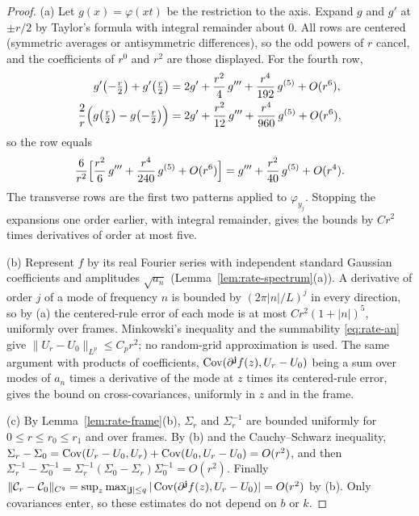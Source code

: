 \begin{proof}
(a) Let $g(x)=\varphi(xt)$ be the restriction to the axis. Expand $g$ and $g'$ at $\pm r/2$ by Taylor's formula with integral remainder about $0$. All rows are centered (symmetric averages or antisymmetric differences), so the odd powers of $r$ cancel, and the coefficients of $r^0$ and $r^2$ are those displayed. For the fourth row,
\begin{align*}
g'\bigl(-\tfrac r2\bigr)+g'\bigl(\tfrac r2\bigr)&=2g'+\frac{r^2}4\,g'''+\frac{r^4}{192}\,g^{(5)}+O(r^6),\\
\frac2r\Bigl(g\bigl(\tfrac r2\bigr)-g\bigl(-\tfrac r2\bigr)\Bigr)&=2g'+\frac{r^2}{12}\,g'''+\frac{r^4}{960}\,g^{(5)}+O(r^6),
\end{align*}
so the row equals
\[
\frac6{r^2}\Bigl[\frac{r^2}6\,g'''+\frac{r^4}{240}\,g^{(5)}+O(r^6)\Bigr]=g'''+\frac{r^2}{40}\,g^{(5)}+O(r^4).
\]
The transverse rows are the first two patterns applied to $\varphi_{y_j}$. Stopping the expansions one order earlier, with integral remainder, gives the bounds by $Cr^2$ times derivatives of order at most five.

(b) Represent $f$ by its real Fourier series with independent standard Gaussian coefficients and amplitudes $\sqrt{a_n}$ (Lemma~\ref{lem:rate-spectrum}(a)). A derivative of order $j$ of a mode of frequency $n$ is bounded by $(2\pi|n|/L)^j$ in every direction, so by (a) the centered-rule error of each mode is at most $Cr^2(1+|n|)^5$, uniformly over frames. Minkowski's inequality and the summability \eqref{eq:rate-an} give $\|U_r-U_0\|_{L^p}\le C_pr^2$; no random-grid approximation is used. The same argument with products of coefficients, $\operatorname{Cov}(\partial^{\mathbf j}f(z),U_r-U_0)$ being a sum over modes of $a_n$ times a derivative of the mode at $z$ times its centered-rule error, gives the bound on cross-covariances, uniformly in $z$ and in the frame.

(c) By Lemma~\ref{lem:rate-frame}(b), $\Sigma_r$ and $\Sigma_r^{-1}$ are bounded uniformly for $0\le r\le r_0\le r_1$ and over frames. By (b) and the Cauchy--Schwarz inequality, $\Sigma_r-\Sigma_0=\operatorname{Cov}(U_r-U_0,U_r)+\operatorname{Cov}(U_0,U_r-U_0)=O(r^2)$, and then $\Sigma_r^{-1}-\Sigma_0^{-1}=\Sigma_r^{-1}(\Sigma_0-\Sigma_r)\Sigma_0^{-1}=O(r^2)$. Finally $\|\mathcal C_r-\mathcal C_0\|_{C^q}=\sup_z\max_{|\mathbf j|\le q}|\operatorname{Cov}(\partial^{\mathbf j}f(z),U_r-U_0)|=O(r^2)$ by (b). Only covariances enter, so these estimates do not depend on $b$ or $k$.
\end{proof}


